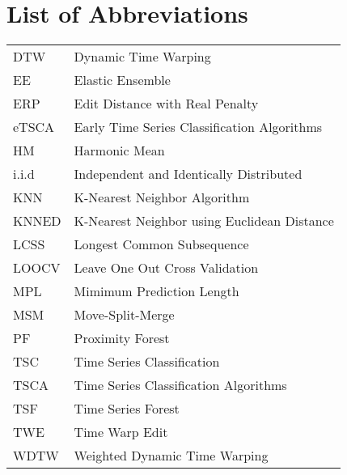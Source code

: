 \section*{List of Abbreviations}


\begin{table}[h!]
\begin{tabular}{ll}
DTW   & Dynamic Time Warping\\
EE   & Elastic Ensemble\\
ERP   & Edit Distance with Real Penalty\\
eTSCA   & Early Time Series Classification Algorithms\\
HM   & Harmonic Mean\\
i.i.d   & Independent and Identically Distributed\\
KNN   & K-Nearest Neighbor Algorithm\\
KNNED   & K-Nearest Neighbor using Euclidean Distance\\
LCSS   & Longest Common Subsequence\\
LOOCV   & Leave One Out Cross Validation\\
MPL   & Mimimum Prediction Length\\
MSM   & Move-Split-Merge\\
PF   & Proximity Forest\\
TSC   & Time Series Classification\\
TSCA   & Time Series Classification Algorithms\\
TSF   & Time Series Forest\\
TWE   & Time Warp Edit\\
WDTW   & Weighted Dynamic Time Warping
\end{tabular}
\end{table}

\null\newpage
